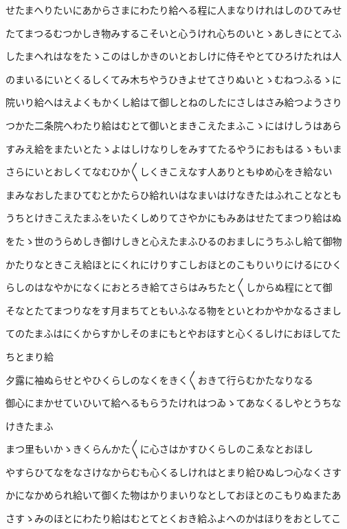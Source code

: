 \documentclass[a4paper,11pt,landscape]{ltjtarticle}
\begin{document}
せたまへりたいにあからさまにわたり給へる程に人まなりけれはしのひてみせ
\par\medskip
たてまつるむつかしき物みするこそいと心うけれ心ちのいとゝあしきにとてふ
\par\medskip
したまへれはなをたゝこのはしかきのいとおしけに侍そやとてひろけたれは人
\par\medskip
のまいるにいとくるしくてみ木ちやうひきよせてさりぬいとゝむねつふるゝに
\par\medskip
院いり給へはえよくもかくし給はて御しとねのしたにさしはさみ給つようさり
\par\medskip
つかた二条院へわたり給はむとて御いとまきこえたまふこゝにはけしうはあら
\par\medskip
すみえ給をまたいとたゝよはしけなりしをみすてたるやうにおもはるゝもいま
\par\medskip
さらにいとおしくてなむひか〱しくきこえなす人ありともゆめ心をき給ない
\par\medskip
まみなおしたまひてむとかたらひ給れいはなまいはけなきたはふれことなとも
\par\medskip
うちとけきこえたまふをいたくしめりてさやかにもみあはせたてまつり給はぬ
\par\medskip
をたゝ世のうらめしき御けしきと心えたまふひるのおましにうちふし給て御物
\par\medskip
かたりなときこえ給ほとにくれにけりすこしおほとのこもりいりにけるにひく
\par\medskip
らしのはなやかになくにおとろき給てさらはみちたと〱しからぬ程にとて御
\par\medskip
そなとたてまつりなをす月まちてともいふなる物をといとわかやかなるさまし
\par\medskip
てのたまふはにくからすかしそのまにもとやおほすと心くるしけにおほしてた
\par\medskip
ちとまり給
\par\medskip
夕露に袖ぬらせとやひくらしのなくをきく〱おきて行らむかたなりなる
\par\medskip
御心にまかせていひいて給へるもらうたけれはつゐゝてあなくるしやとうちな
\par\medskip
けきたまふ
\par\medskip
まつ里もいかゝきくらんかた〱に心さはかすひくらしのこゑなとおほし
\par\medskip
やすらひてなをなさけなからむも心くるしけれはとまり給ひぬしつ心なくさす
\par\medskip
かになかめられ給いて御くた物はかりまいりなとしておほとのこもりぬまたあ
\par\medskip
さすゝみのほとにわたり給はむとてとくおき給ふよへのかはほりをおとしてこ
\end{document}
